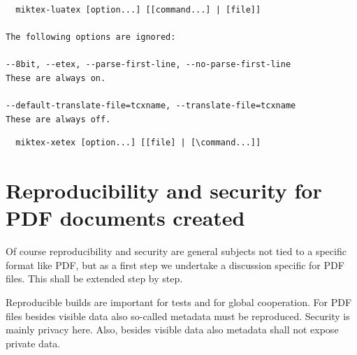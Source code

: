 \documentclass[a4paper]{article}%
\newcommand{\lualatex}{\texttt{lualatex}}
\newcommand{\xelatex}{\texttt{xelatex}}
\newcommand{\texlive}{\TeX~Live}
\newcommand{\miktex}{MiKTeX}
\begin{document}
\begin{verbatim}
  miktex-luatex [option...] [[command...] | [file]]

The following options are ignored:

--8bit, --etex, --parse-first-line, --no-parse-first-line
These are always on.

--default-translate-file=tcxname, --translate-file=tcxname
These are always off.
\end{verbatim}



  
  
  

\begin{verbatim}
  miktex-xetex [option...] [[file] | [\command...]]
\end{verbatim}







\section{Reproducibility and security for PDF documents created}\label{sec:PDFreprSec}

Of course reproducibility and security are general subjects not tied to a specific format like PDF, 
but as a first step we undertake a discussion specific for PDF files. 
This shall be extended step by step. 

Reproducible builds are important for tests and for global cooperation. 
For PDF files besides visible data also so-called metadata must be reproduced. 
Security is mainly privacy here. 
Also, besides visible data also metadata shall not expose private data. 
\end{document}

